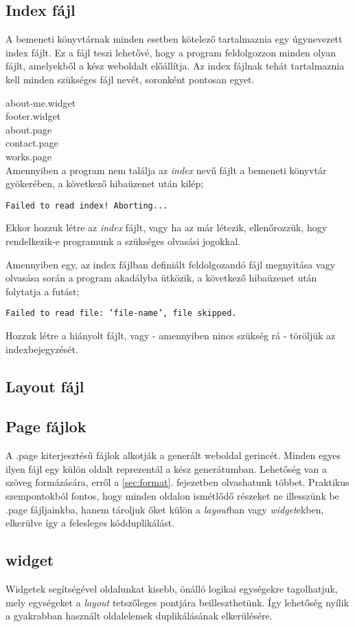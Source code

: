 \documentclass[a4paper,10pt]{article}
\begin{document}
\subsection{Index fájl}
A bemeneti könyvtárnak minden esetben kötelező tartalmaznia egy úgynevezett index fájlt. Ez a fájl teszi lehetővé, hogy a program feldolgozzon minden olyan fájlt, amelyekből a kész weboldalt előállítja.
Az index fájlnak tehát tartalmaznia kell minden szükséges fájl nevét, soronként pontosan egyet.

about-me.widget \\
footer.widget \\
about.page \\
contact.page \\
works.page \\

Amennyiben a program nem találja az \emph{index} nevű fájlt a bemeneti könyvtár gyökerében, a következő hibaüzenet után kilép;

\texttt{Failed to read index! Aborting...}

Ekkor hozzuk létre az \emph{index} fájlt, vagy ha az már létezik, ellenőrozzük, hogy rendelkezik-e programunk a szükséges olvasási jogokkal.

Amennyiben egy, az index fájlban definiált feldolgozandó fájl megnyitása vagy olvasása során a program akadályba ütközik, a következő hibaüzenet után folytatja a futást;

\texttt{Failed to read file: 'file-name', file skipped.}

Hozzuk létre a hiányolt fájlt, vagy - amennyiben nincs szükség rá - töröljük az indexbejegyzését.

\subsection{Layout fájl}
\subsection{Page fájlok}
A .page kiterjesztésű fájlok alkotják a generált weboldal gerincét. Minden egyes ilyen fájl egy külön oldalt reprezentál a kész generátumban. Lehetőség van a szöveg formázására, erről a \ref{sec:format}. fejezetben olvashatunk többet.
Praktikus szempontokból fontos, hogy minden oldalon ismétlődő részeket ne illesszünk be .page fájljainkba, hanem tároljuk őket külön a \emph{layout}ban vagy \emph{widget}ekben, elkerülve így a felesleges kódduplikálást.
\subsection{widget}
Widgetek segítségével oldalunkat kisebb, önálló logikai egységekre tagolhatjuk, mely egységeket a \emph{layout} tetszőleges pontjára beilleszthetünk. Így lehetőség nyílik a gyakrabban használt oldalelemek duplikálásának elkerülésére.
\end{document}
